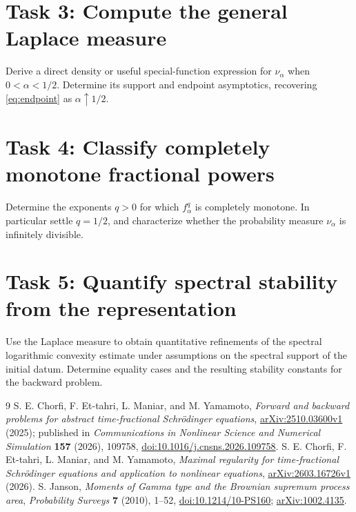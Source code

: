 \documentclass[11pt]{article}
\begin{document}
\section*{Task 3: Compute the general Laplace measure}
Derive a direct density or useful special-function expression for
$\nu_\alpha$ when $0<\alpha<1/2$. Determine its support and endpoint
asymptotics, recovering \eqref{eq:endpoint} as $\alpha\uparrow1/2$.

\section*{Task 4: Classify completely monotone fractional powers}
Determine the exponents $q>0$ for which $f_\alpha^q$ is completely
monotone. In particular settle $q=1/2$, and characterize whether the
probability measure $\nu_\alpha$ is infinitely divisible.

\section*{Task 5: Quantify spectral stability from the representation}
Use the Laplace measure to obtain quantitative refinements of the
spectral logarithmic convexity estimate under assumptions on the
spectral support of the initial datum. Determine equality cases and
the resulting stability constants for the backward problem.

\begin{thebibliography}{9}
S. E. Chorfi, F. Et-tahri, L. Maniar, and M. Yamamoto,
\emph{Forward and backward problems for abstract time-fractional
Schr\"odinger equations}, \href{https://arxiv.org/abs/2510.03600}{arXiv:2510.03600v1}
(2025); published in \emph{Communications in Nonlinear Science and
Numerical Simulation} \textbf{157} (2026), 109758,
\href{https://doi.org/10.1016/j.cnsns.2026.109758}{doi:10.1016/j.cnsns.2026.109758}.
S. E. Chorfi, F. Et-tahri, L. Maniar, and M. Yamamoto,
\emph{Maximal regularity for time-fractional Schr\"odinger equations
and application to nonlinear equations},
\href{https://arxiv.org/abs/2603.16726}{arXiv:2603.16726v1} (2026).
S. Janson, \emph{Moments of Gamma type and the Brownian supremum process
area}, \emph{Probability Surveys} \textbf{7} (2010), 1--52,
\href{https://doi.org/10.1214/10-PS160}{doi:10.1214/10-PS160};
\href{https://arxiv.org/abs/1002.4135}{arXiv:1002.4135}.
\end{thebibliography}
\end{document}
